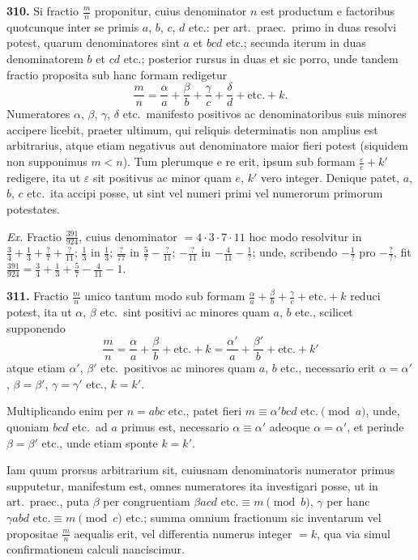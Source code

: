 \documentclass[12pt,a4paper]{article}
\theoremstyle{plain}
\theoremstyle{definition}
\theoremstyle{remark}
\begin{document}
\textbf{310.} Si fractio $\frac{m}{n}$ proponitur, cuius denominator $n$ est productum e factoribus quotcunque inter se primis $a$, $b$, $c$, $d$ etc.: per art.~praec.~primo in duas resolvi potest, quarum denominatores sint $a$ et $bcd$ etc.; secunda iterum in duas denominatorem $b$ et $cd$ etc.; posterior rursus in duas et sic porro, unde tandem fractio proposita sub hanc formam redigetur
\[
\frac{m}{n} = \frac{\alpha}{a} + \frac{\beta}{b} + \frac{\gamma}{c} + \frac{\delta}{d} + \text{etc.} + k.
\]
Numeratores $\alpha$, $\beta$, $\gamma$, $\delta$ etc.~manifesto positivos ac denominatoribus suis minores accipere licebit, praeter ultimum, qui reliquis determinatis non amplius est arbitrarius, atque etiam negativus aut denominatore maior fieri potest (siquidem non supponimus $m < n$). Tum plerumque e re erit, ipsum sub formam $\frac{\varepsilon}{e} + k'$ redigere, ita ut $\varepsilon$ sit positivus ac minor quam $e$, $k'$ vero integer. Denique patet, $a$, $b$, $c$ etc.~ita accipi posse, ut sint vel numeri primi vel numerorum primorum potestates.

\textit{Ex.} Fractio $\frac{391}{924}$, cuius denominator $= 4 \cdot 3 \cdot 7 \cdot 11$ hoc modo resolvitur in $\frac{3}{4} + \frac{1}{3} + \frac{?}{7} + \frac{?}{11}$; $\frac{1}{3}$ in $\frac{1}{3}$; $\frac{?}{77}$ in $\frac{5}{7} - \frac{?}{11}$; $-\frac{?}{11}$ in $-\frac{4}{11} - \frac{1}{?}$; unde, scribendo $-\frac{1}{?}$ pro $-\frac{?}{?}$, fit $\frac{391}{924} = \frac{3}{4} + \frac{1}{3} + \frac{5}{7} - \frac{4}{11} - 1$.

\textbf{311.} Fractio $\frac{m}{n}$ unico tantum modo sub formam $\frac{\alpha}{a} + \frac{\beta}{b} + \frac{\gamma}{c} + \text{etc.} + k$ reduci potest, ita ut $\alpha$, $\beta$ etc.~sint positivi ac minores quam $a$, $b$ etc., scilicet supponendo
\[
\frac{m}{n} = \frac{\alpha}{a} + \frac{\beta}{b} + \text{etc.} + k = \frac{\alpha'}{a} + \frac{\beta'}{b} + \text{etc.} + k'
\]
atque etiam $\alpha'$, $\beta'$ etc.~positivos ac minores quam $a$, $b$ etc., necessario erit $\alpha = \alpha'$, $\beta = \beta'$, $\gamma = \gamma'$ etc., $k = k'$.

Multiplicando enim per $n = abc$ etc., patet fieri $m \equiv \alpha' bcd \text{ etc.} \pmod{a}$, unde, quoniam $bcd$ etc.~ad $a$ primus est, necessario $\alpha \equiv \alpha'$ adeoque $\alpha = \alpha'$, et perinde $\beta = \beta'$ etc., unde etiam sponte $k = k'$.

Iam quum prorsus arbitrarium sit, cuiusnam denominatoris numerator primus supputetur, manifestum est, omnes numeratores ita investigari posse, ut in art.~praec., puta $\beta$ per congruentiam $\beta acd \text{ etc.} \equiv m \pmod{b}$, $\gamma$ per hanc $\gamma abd \text{ etc.} \equiv m \pmod{c}$ etc.; summa omnium fractionum sic inventarum vel propositae $\frac{m}{n}$ aequalis erit, vel differentia numerus integer $= k$, qua via simul confirmationem calculi nanciscimur.
\end{document}
